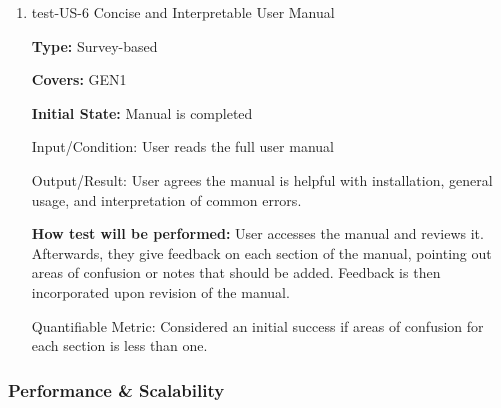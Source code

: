 \documentclass[12pt, titlepage]{article}
\begin{document}
\begin{enumerate}
\textbf{Initial State:} Application open
					
Input/Condition: User performs interactions that are known to result in error
					
Output/Result: USABILITY\_PERCENTAGE\% of respondents agree that errors are informative
					
\textbf{How test will be performed:} The user will be given direction in how to trigger different errors, and be exposed to
all warning and error messages the system can generate. Users will explain whether they find it easy to understand
or not (e.g. pass/fail). Investigation in how to reword prompts will take place for messages that under USABILITY\_PERCENTAGE\% of users
do not understand.

Quantifiable Metric: For all messages, USABILITY\_PERCENTAGE\% of users 'pass'.

\item{test-US-6 Concise and Interpretable User Manual\\}
\label{sec:t-nf-6}

\textbf{Type:} Survey-based

\textbf{Covers:} GEN1
					
\textbf{Initial State:} Manual is completed
					
Input/Condition: User reads the full user manual
					
Output/Result: User agrees the manual is helpful with installation, general usage, and interpretation of common errors.
					
\textbf{How test will be performed:} User accesses the manual and reviews it. Afterwards, they give feedback on each section of 
the manual, pointing out areas of confusion or notes that should be added. Feedback is then incorporated upon revision
of the manual.

Quantifiable Metric: Considered an initial success if areas of confusion for each section is less than one.

\end{enumerate}

\subsubsection{Performance \& Scalability}
\end{document}

